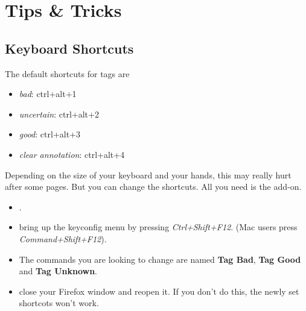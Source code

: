 \documentclass[12pt]{article}
\begin{document}
\section{Tips \& Tricks}
\label{TnT}
\subsection{Keyboard Shortcuts}
The default shortcuts for tags are \\
\begin{itemize}
	\item \emph{bad}: ctrl+alt+1
	\item \emph{uncertain}: ctrl+alt+2
	\item \emph{good}: ctrl+alt+3
	\item \emph{clear annotation}: ctrl+alt+4
\end{itemize}

Depending on the size of your keyboard and your hands, this may really hurt after some pages. But you can change the shortcuts. All you need is the  add-on.

\begin{itemize}
	\item {}.
	\item bring up the keyconfig menu by pressing \emph{Ctrl+Shift+F12}. (Mac users press \emph{Command+Shift+F12}).
	\item The commands you are looking to change are named \textbf{Tag Bad}, \textbf{Tag Good} and \textbf{Tag Unknown}.
	\item close your Firefox window and reopen it. If you don't do this, the newly set shortcots won't work.
\end{itemize}
\end{document}
